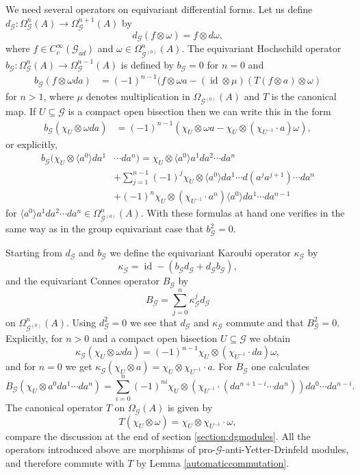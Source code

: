 \documentclass{amsart}
\newcommand{\G}{\mathcal{G}}
\newcommand{\ccinfty}{C_c^\infty}
\DeclareMathOperator{\id}{id}
\begin{document}
We need several operators on equivariant differential forms. Let us define $ d_\G: \Omega^n_\G(A) \rightarrow \Omega^{n + 1}_\G(A) $ by 
$$
d_\G(f\otimes \omega) = f\otimes d\omega,
$$ 
where $ f \in \ccinfty(\G_{ad}) $ and $ \omega \in \Omega^n_{\G^{(0)}}(A) $.
The equivariant Hochschild operator $ b_\G: \Omega^n_\G(A) \rightarrow \Omega^{n - 1}_\G(A) $ is defined by $ b_\G = 0 $ for $ n = 0 $ and 
\begin{align*}
b_\G(f\otimes \omega da) &= (-1)^{n - 1} (f \otimes \omega a - (\id \otimes \mu)(T(f \otimes a) \otimes \omega) 
\end{align*} 
for $ n > 1 $, where $ \mu $ denotes multiplication in $ \Omega_{\G^{(0)}}(A) $ and $ T $ is the canonical map. If $ U \subseteq \G $ is a compact open bisection then we can write this in the form 
\begin{align*}
b_\G(\chi_U \otimes \omega da) &= (-1)^{n - 1} (\chi_U \otimes \omega a - \chi_U \otimes (\chi_{U^{-1}} \cdot a)\omega), 
\end{align*} 
or explicitly, 
\begin{align*}
b_\G(\chi_U \otimes \langle a^0 \rangle da^1&\cdots da^n) = \chi_U \otimes \langle a^0 \rangle a^1da^2\cdots da^n \\
&+ \sum_{j = 1}^{n - 1}(-1)^j \chi_U \otimes \langle a^0 \rangle da^1\cdots d(a^ja^{j+1}) \cdots da^n \\
&+ (-1)^n \chi_U \otimes (\chi_{U^{-1}} \cdot a^n)\langle a^0 \rangle d a^1 \cdots d a^{n-1}
\end{align*}
for $ \langle a^0 \rangle a^1da^2\cdots da^n \in \Omega^n_{\G^{(0)}}(A) $. 
With these formulas at hand one verifies in the same way as in the group equivariant case that $ b_\G^2 = 0 $. 

Starting from $ d_\G $ and $ b_\G $ we define the equivariant Karoubi operator $ \kappa_\G $ by
$$
\kappa_\G = \id - (b_\G d_\G + d_\G b_\G),
$$ 
and the equivariant Connes operator $ B_\G $ by 
$$
B_\G = \sum_{j = 0}^n \kappa_\G^j d_\G
$$  
on $ \Omega^n_{\G^{(0)}}(A) $. Using $ d_\G^2 = 0 $ we see that $ d_\G $ and $ \kappa_{\G} $ commute and that $ B_\G^2 = 0 $.
Explicitly, for $ n > 0 $ and a compact open bisection $ U \subseteq \G $ we obtain 
$$
\kappa_\G(\chi_U \otimes \omega da) = (-1)^{n - 1} \chi_U \otimes (\chi_{U^{-1}} \cdot da) \omega,
$$
and for $ n = 0 $ we get $ \kappa_\G(\chi_U \otimes a) = \chi_U \otimes \chi_{U^{-1}} \cdot a $. For $ B_\G $ one calculates
$$
B_\G(\chi_U \otimes a^0da^1\cdots da^n) = \sum_{i = 0}^n (-1)^{ni} \chi_U \otimes (\chi_{U^{-1}} \cdot (da^{n+1-i} \cdots da^n)) da^0 \cdots da^{n - i}.
$$
The canonical operator $ T $ on $ \Omega_\G(A) $ is given by 
$$
T(\chi_U \otimes \omega) = \chi_U \otimes \chi_{U^{-1}} \cdot \omega,  
$$
compare the discussion at the end of section \ref{section:dgmodules}. All the operators introduced above are morphisms of pro-$ \G $-anti-Yetter-Drinfeld modules, and therefore commute with $ T $ by Lemma \ref{automaticcommutation}. 
\end{document}
